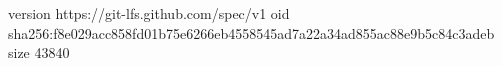 version https://git-lfs.github.com/spec/v1
oid sha256:f8e029acc858fd01b75e6266eb4558545ad7a22a34ad855ac88e9b5c84c3adeb
size 43840
